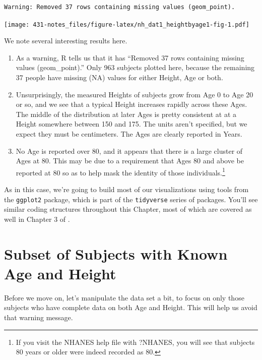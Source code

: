 \documentclass[
]{book}
\providecommand{\tightlist}{%
  \setlength{\itemsep}{0pt}\setlength{\parskip}{0pt}}
\begin{document}
\begin{verbatim}
Warning: Removed 37 rows containing missing values (geom_point).
\end{verbatim}

\texttt{[image: 431-notes\_files/figure-latex/nh\_dat1\_heightbyage1-fig-1.pdf]}

We note several interesting results here.

\begin{enumerate}
\def\labelenumi{\arabic{enumi}.}
\tightlist
\item
  As a warning, R tells us that it has ``Removed 37 rows containing missing values (geom\_point).'' Only 963 subjects plotted here, because the remaining 37 people have missing (NA) values for either Height, Age or both.
\item
  Unsurprisingly, the measured Heights of subjects grow from Age 0 to Age 20 or so, and we see that a typical Height increases rapidly across these Ages. The middle of the distribution at later Ages is pretty consistent at at a Height somewhere between 150 and 175. The units aren't specified, but we expect they must be centimeters. The Ages are clearly reported in Years.
\item
  No Age is reported over 80, and it appears that there is a large cluster of Ages at 80. This may be due to a requirement that Ages 80 and above be reported at 80 so as to help mask the identity of those individuals.\footnote{If you visit the NHANES help file with ?NHANES, you will see that subjects 80 years or older were indeed recorded as 80.}
\end{enumerate}

As in this case, we're going to build most of our visualizations using tools from the \texttt{ggplot2} package, which is part of the \texttt{tidyverse} series of packages. You'll see similar coding structures throughout this Chapter, most of which are covered as well in Chapter 3 of \citet{R4DS}.

\hypertarget{subset-of-subjects-with-known-age-and-height}{%
\section{Subset of Subjects with Known Age and Height}\label{subset-of-subjects-with-known-age-and-height}}

Before we move on, let's manipulate the data set a bit, to focus on only those subjects who have complete data on both Age and Height. This will help us avoid that warning message.
\end{document}
